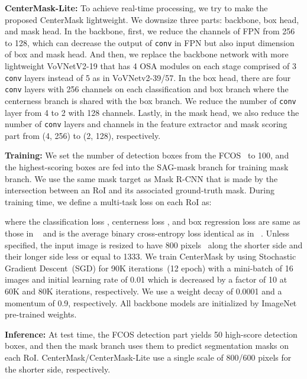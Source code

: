 \documentclass[10pt,twocolumn,letterpaper]{article}
\begin{document}
\noindent
\textbf{CenterMask-Lite:}
To achieve real-time processing, we try to make the proposed CenterMask lightweight.
We downsize three parts: backbone, box head, and mask head.
In the backbone, first, we reduce the channels  of FPN from 256 to 128, which can decrease the output of  \texttt{conv} in FPN but also input dimension of box and mask head.
And then, we replace the backbone network with more lightweight VoVNetV2-19 that has 4 OSA modules on each stage comprised of 3 \texttt{conv} layers instead of 5 as in VoVNetv2-39/57.
In the box head, there are four  \texttt{conv} layers with 256 channels on each classification and box branch where the centerness branch is shared with the box branch.
We reduce the number of \texttt{conv} layer from 4 to 2 with 128 channels.
Lastly, in the mask head, we also reduce the number of \texttt{conv} layers and channels in the feature extractor and mask scoring part from (4, 256) to (2, 128), respectively.

\noindent
\textbf{Training:}
We set the number of detection boxes from the FCOS~\cite{Tian_2019_ICCV} to 100, and the highest-scoring boxes are fed into the SAG-mask branch for training mask branch.
We use the same mask target as Mask R-CNN that is made by the intersection between an RoI and its associated ground-truth mask.
During training time, we define a multi-task loss on each RoI as:



\noindent
where the classification loss , centerness loss , and box regression loss  are same as those in ~\cite{Tian_2019_ICCV} and  is the average binary cross-entropy loss identical as in ~\cite{he2017mask}.
Unless specified, the input image is resized to have 800 pixels~\cite{lin2017feature} along the shorter side and their longer side less or equal to 1333.
We train CenterMask by using Stochastic Gradient Descent~(SGD) for 90K iterations~(12 epoch) with a mini-batch of 16 images and initial learning rate of 0.01 which is decreased by a factor of 10 at 60K and 80K iterations, respectively.
We use a weight decay of 0.0001 and a momentum of 0.9, respectively.
All backbone models are initialized by ImageNet pre-trained weights. 


\noindent
\textbf{Inference:}
At test time, the FCOS detection part yields 50 high-score detection boxes, and then the mask branch uses them to predict segmentation masks on each RoI.
CenterMask/CenterMask-Lite use a single scale of 800/600 pixels for the shorter side, respectively.
\end{document}
